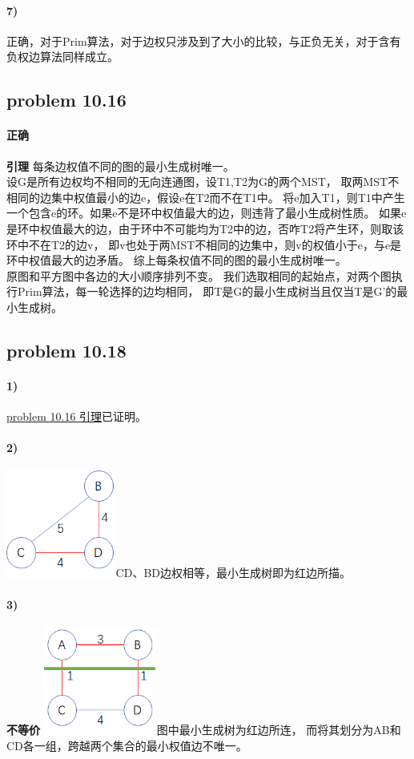 \documentclass[11pt,a4paper,oneside,oldfontcommands]{ctexart}
\begin{document}
\paragraph*{7)}
正确，对于Prim算法，对于边权只涉及到了大小的比较，与正负无关，对于含有负权边算法同样成立。
\hypertarget{problem1016}{\subsection*{problem 10.16}}
\paragraph*{正确}{\textbf{引理 }}每条边权值不同的图的最小生成树唯一。\\
设G是所有边权均不相同的无向连通图，设T1,T2为G的两个MST，
取两MST不相同的边集中权值最小的边e，假设e在T2而不在T1中。
将e加入T1，则T1中产生一个包含e的环。如果e不是环中权值最大的边，则违背了最小生成树性质。
如果e是环中权值最大的边，由于环中不可能均为T2中的边，否咋T2将产生环，则取该环中不在T2的边v，
即v也处于两MST不相同的边集中，则v的权值小于e，与e是环中权值最大的边矛盾。
综上每条权值不同的图的最小生成树唯一。\\
原图和平方图中各边的大小顺序排列不变。
我们选取相同的起始点，对两个图执行Prim算法，每一轮选择的边均相同，
即T是G的最小生成树当且仅当T是G'的最小生成树。
{\subsection*{problem 10.18}}
\paragraph*{1)}
\hyperlink{problem1016}{problem 10.16 引理}已证明。
\paragraph*{2)}
\includegraphics[height=100pt]{10-18-2.png}CD、BD边权相等，最小生成树即为红边所描。
\paragraph*{3)}
\textbf{不等价}
\includegraphics[height=100pt]{10-18.png}图中最小生成树为红边所连，
而将其划分为AB和CD各一组，跨越两个集合的最小权值边不唯一。
\end{document}
